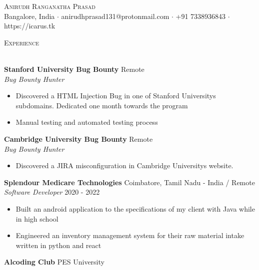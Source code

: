 \documentclass[a4paper]{article}
\newcommand{\lineunder} {
    \vspace*{-8pt} \\
    \hspace*{-18pt} \hrulefill \\
}
\newcommand{\header} [1] {
    {\hspace*{-18pt}\vspace*{6pt} \textsc{#1}}
    \vspace*{-6pt} \lineunder
}
\begin{document}
\vspace*{-40pt}

    

\vspace*{-10pt}
\begin{center}
	{\Huge \scshape {Anirudh Ranganatha Prasad}}\\
	Bangalore, India $\cdot$ anirudhprasad131@protonmail.com $\cdot$ +91 7338936843 $\cdot$ https://icarus.tk\\
\end{center}



\header{Experience}
\vspace{1mm}

\textbf{Stanford University Bug Bounty} \hfill Remote\\
\textit{Bug Bounty Hunter}\\
\vspace{-1mm}
\begin{itemize} \itemsep 1pt
	\item Discovered a HTML Injection Bug in one of Stanford University\textquotesingle{}s subdomains. Dedicated one month towards the program
	\item Manual testing and automated testing process
\end{itemize}
\textbf{Cambridge University Bug Bounty} \hfill Remote\\
\textit{Bug Bounty Hunter}\\
\vspace{-1mm}
\begin{itemize} \itemsep 1pt
	\item Discovered a JIRA misconfiguration in Cambridge University\textquotesingle{}s website.
\end{itemize}
\textbf{Splendour Medicare Technologies} \hfill Coimbatore, Tamil Nadu - India / Remote\\
\textit{Software Developer} \hfill 2020 - 2022\\
\vspace{-1mm}
\begin{itemize} \itemsep 1pt
	\item Built an android application to the specifications of my client with Java while in high school
	\item Engineered an inventory management system for their raw material intake written in python and react
\end{itemize}
\textbf{Alcoding Club} \hfill PES University\\
\end{document}
